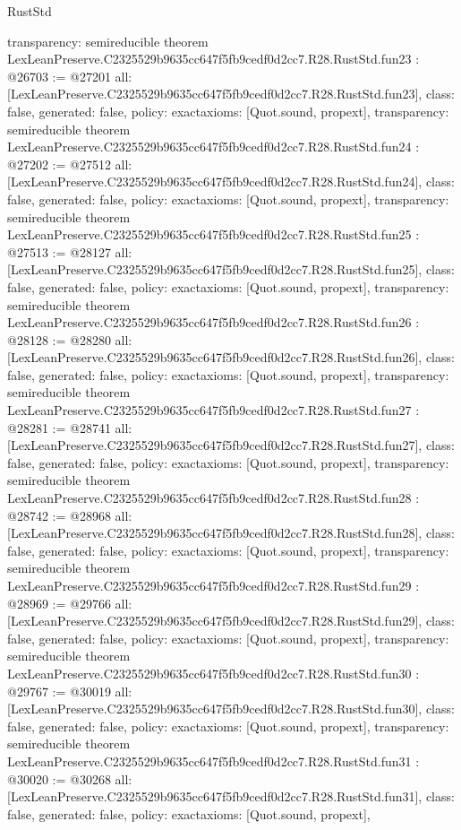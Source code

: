 \begin{lexlean}{RustStd}
\begin{coremodule}
{  transparency: semireducible
}
theorem LexLeanPreserve.C2325529b9635cc647f5fb9cedf0d2cc7.R28.RustStd.fun23 : @26703 := @27201 {
  all: [LexLeanPreserve.C2325529b9635cc647f5fb9cedf0d2cc7.R28.RustStd.fun23],
  class: false,
  generated: false,
  policy: exact{axioms: [Quot.sound, propext]},
  transparency: semireducible
}
theorem LexLeanPreserve.C2325529b9635cc647f5fb9cedf0d2cc7.R28.RustStd.fun24 : @27202 := @27512 {
  all: [LexLeanPreserve.C2325529b9635cc647f5fb9cedf0d2cc7.R28.RustStd.fun24],
  class: false,
  generated: false,
  policy: exact{axioms: [Quot.sound, propext]},
  transparency: semireducible
}
theorem LexLeanPreserve.C2325529b9635cc647f5fb9cedf0d2cc7.R28.RustStd.fun25 : @27513 := @28127 {
  all: [LexLeanPreserve.C2325529b9635cc647f5fb9cedf0d2cc7.R28.RustStd.fun25],
  class: false,
  generated: false,
  policy: exact{axioms: [Quot.sound, propext]},
  transparency: semireducible
}
theorem LexLeanPreserve.C2325529b9635cc647f5fb9cedf0d2cc7.R28.RustStd.fun26 : @28128 := @28280 {
  all: [LexLeanPreserve.C2325529b9635cc647f5fb9cedf0d2cc7.R28.RustStd.fun26],
  class: false,
  generated: false,
  policy: exact{axioms: [Quot.sound, propext]},
  transparency: semireducible
}
theorem LexLeanPreserve.C2325529b9635cc647f5fb9cedf0d2cc7.R28.RustStd.fun27 : @28281 := @28741 {
  all: [LexLeanPreserve.C2325529b9635cc647f5fb9cedf0d2cc7.R28.RustStd.fun27],
  class: false,
  generated: false,
  policy: exact{axioms: [Quot.sound, propext]},
  transparency: semireducible
}
theorem LexLeanPreserve.C2325529b9635cc647f5fb9cedf0d2cc7.R28.RustStd.fun28 : @28742 := @28968 {
  all: [LexLeanPreserve.C2325529b9635cc647f5fb9cedf0d2cc7.R28.RustStd.fun28],
  class: false,
  generated: false,
  policy: exact{axioms: [Quot.sound, propext]},
  transparency: semireducible
}
theorem LexLeanPreserve.C2325529b9635cc647f5fb9cedf0d2cc7.R28.RustStd.fun29 : @28969 := @29766 {
  all: [LexLeanPreserve.C2325529b9635cc647f5fb9cedf0d2cc7.R28.RustStd.fun29],
  class: false,
  generated: false,
  policy: exact{axioms: [Quot.sound, propext]},
  transparency: semireducible
}
theorem LexLeanPreserve.C2325529b9635cc647f5fb9cedf0d2cc7.R28.RustStd.fun30 : @29767 := @30019 {
  all: [LexLeanPreserve.C2325529b9635cc647f5fb9cedf0d2cc7.R28.RustStd.fun30],
  class: false,
  generated: false,
  policy: exact{axioms: [Quot.sound, propext]},
  transparency: semireducible
}
theorem LexLeanPreserve.C2325529b9635cc647f5fb9cedf0d2cc7.R28.RustStd.fun31 : @30020 := @30268 {
  all: [LexLeanPreserve.C2325529b9635cc647f5fb9cedf0d2cc7.R28.RustStd.fun31],
  class: false,
  generated: false,
  policy: exact{axioms: [Quot.sound, propext]},
}
\end{coremodule}
\end{lexlean}
